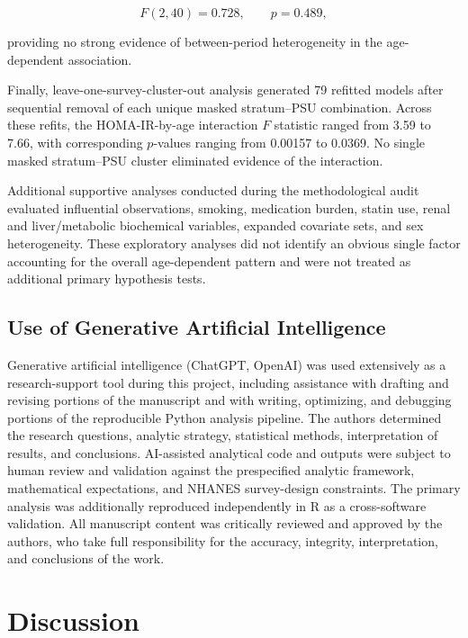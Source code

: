 \documentclass[11pt]{article}
\begin{document}
\[
F(2,40)=0.728,
\qquad
p=0.489,
\]

providing no strong evidence of between-period heterogeneity in the
age-dependent association.

Finally, leave-one-survey-cluster-out analysis generated 79 refitted
models after sequential removal of each unique masked
stratum--PSU combination. Across these refits, the HOMA-IR-by-age
interaction $F$ statistic ranged from 3.59 to 7.66, with corresponding
$p$-values ranging from 0.00157 to 0.0369. No single masked
stratum--PSU cluster eliminated evidence of the interaction.

Additional supportive analyses conducted during the methodological
audit evaluated influential observations, smoking, medication burden,
statin use, renal and liver/metabolic biochemical variables, expanded
covariate sets, and sex heterogeneity. These exploratory analyses did
not identify an obvious single factor accounting for the overall
age-dependent pattern and were not treated as additional primary
hypothesis tests.

\subsection{Use of Generative Artificial Intelligence}

Generative artificial intelligence (ChatGPT, OpenAI) was used extensively
as a research-support tool during this project, including assistance with
drafting and revising portions of the manuscript and with writing,
optimizing, and debugging portions of the reproducible Python analysis
pipeline. The authors determined the research questions, analytic strategy,
statistical methods, interpretation of results, and conclusions. AI-assisted
analytical code and outputs were subject to human review and validation
against the prespecified analytic framework, mathematical expectations,
and NHANES survey-design constraints. The primary analysis was additionally
reproduced independently in R as a cross-software validation. All manuscript
content was critically reviewed and approved by the authors, who take full
responsibility for the accuracy, integrity, interpretation, and conclusions
of the work.


\section{Discussion}
\end{document}
